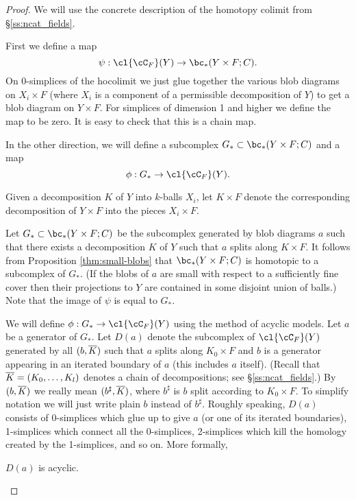 \begin{proof}
We will use the concrete description of the homotopy colimit from \S\ref{ss:ncat_fields}.

First we define a map 
\[
	\psi: \cl{\cC_F}(Y) \to \bc_*(Y\times F;C) .
\]
On 0-simplices of the hocolimit 
we just glue together the various blob diagrams on $X_i\times F$
(where $X_i$ is a component of a permissible decomposition of $Y$) to get a blob diagram on
$Y\times F$.
For simplices of dimension 1 and higher we define the map to be zero.
It is easy to check that this is a chain map.

In the other direction, we will define a subcomplex $G_*\sub \bc_*(Y\times F;C)$
and a map
\[
	\phi: G_* \to \cl{\cC_F}(Y) .
\]

Given a decomposition $K$ of $Y$ into $k$-balls $X_i$, let $K\times F$ denote the corresponding
decomposition of $Y\times F$ into the pieces $X_i\times F$.

Let $G_*\sub \bc_*(Y\times F;C)$ be the subcomplex generated by blob diagrams $a$ such that there
exists a decomposition $K$ of $Y$ such that $a$ splits along $K\times F$.
It follows from Proposition \ref{thm:small-blobs} that $\bc_*(Y\times F; C)$ is homotopic to a subcomplex of $G_*$.
(If the blobs of $a$ are small with respect to a sufficiently fine cover then their
projections to $Y$ are contained in some disjoint union of balls.)
Note that the image of $\psi$ is equal to $G_*$.

We will define $\phi: G_* \to \cl{\cC_F}(Y)$ using the method of acyclic models.
Let $a$ be a generator of $G_*$.
Let $D(a)$ denote the subcomplex of $\cl{\cC_F}(Y)$ generated by all $(b, \overline{K})$
such that $a$ splits along $K_0\times F$ and $b$ is a generator appearing
in an iterated boundary of $a$ (this includes $a$ itself).
(Recall that $\overline{K} = (K_0,\ldots,K_l)$ denotes a chain of decompositions;
see \S\ref{ss:ncat_fields}.)
By $(b, \overline{K})$ we really mean $(b^\sharp, \overline{K})$, where $b^\sharp$ is 
$b$ split according to $K_0\times F$.
To simplify notation we will just write plain $b$ instead of $b^\sharp$.
Roughly speaking, $D(a)$ consists of 0-simplices which glue up to give
$a$ (or one of its iterated boundaries), 1-simplices which connect all the 0-simplices, 
2-simplices which kill the homology created by the 
1-simplices, and so on.
More formally,
 
\begin{lemma} \label{lem:d-a-acyclic}
$D(a)$ is acyclic.
\end{lemma}


\end{proof}
